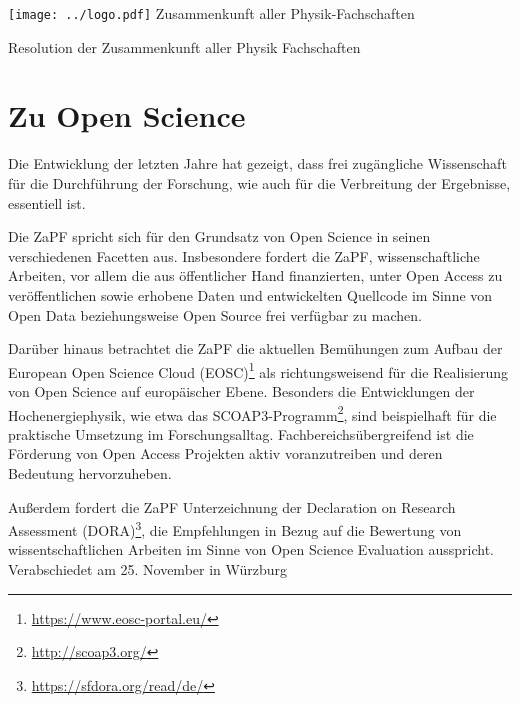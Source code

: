 \documentclass[DIV=calc]{scrartcl}
\begin{document}
    \hspace{0.87\textwidth}
    \begin{minipage}{120pt}
        \vspace{-1.8cm}
        \texttt{[image: ../logo.pdf]}
        \centering
        \small Zusammenkunft aller Physik-Fachschaften
    \end{minipage}
    \begin{center}
        \huge{Resolution der Zusammenkunft aller Physik Fachschaften}\vspace{.25\baselineskip}\\
        \normalsize
    \end{center}
    \vspace{1cm}

\section*{Zu Open Science}

Die Entwicklung der letzten Jahre hat gezeigt, dass frei zugängliche Wissenschaft für die Durchführung der Forschung, wie auch für die Verbreitung der Ergebnisse,  essentiell ist.

Die ZaPF spricht sich für den Grundsatz von Open Science in seinen verschiedenen Facetten aus.  Insbesondere fordert die ZaPF, wissenschaftliche Arbeiten, vor allem die aus öffentlicher Hand finanzierten, unter Open Access zu veröffentlichen sowie erhobene Daten und entwickelten Quellcode im Sinne von Open Data beziehungsweise Open Source frei verfügbar zu machen.

Darüber hinaus betrachtet die ZaPF die aktuellen Bemühungen zum Aufbau der European Open Science Cloud (EOSC)\footnote{\url{https://www.eosc-portal.eu/}} als richtungsweisend für die Realisierung von Open Science auf europäischer Ebene.
Besonders die Entwicklungen der Hochenergiephysik, wie etwa das SCOAP3-Programm\footnote{\url{http://scoap3.org/}}, sind beispielhaft für die praktische Umsetzung im Forschungsalltag. Fachbereichsübergreifend ist die Förderung von Open Access Projekten aktiv voranzutreiben und deren Bedeutung hervorzuheben.

Außerdem fordert die ZaPF Unterzeichnung der Declaration on Research Assessment (DORA)\footnote{\url{https://sfdora.org/read/de/}}, die Empfehlungen in Bezug auf die Bewertung von wissentschaftlichen Arbeiten im Sinne von Open Science Evaluation ausspricht.\\
\vfill\hfill Verabschiedet am 25. November in Würzburg\\
\end{document}
